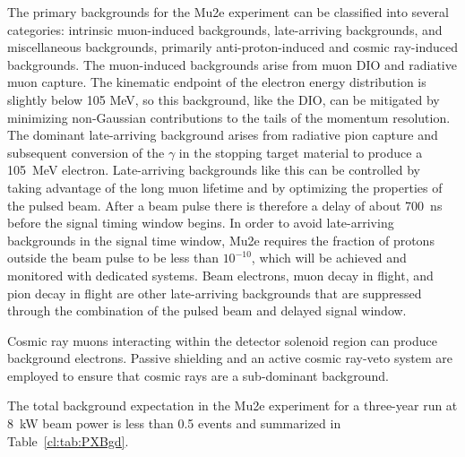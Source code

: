 The primary backgrounds for the Mu2e experiment can be classified into
several categories: intrinsic muon-induced backgrounds, late-arriving
backgrounds, and miscellaneous backgrounds, primarily anti-proton-induced 
and cosmic ray-induced backgrounds. The muon-induced
backgrounds arise from muon DIO and radiative muon capture.  The
kinematic endpoint of the electron energy distribution is slightly
below 105 MeV, so this background, like the DIO, can be mitigated by
minimizing non-Gaussian contributions to the tails of the momentum
resolution.  The dominant late-arriving background arises from
radiative pion capture and subsequent conversion of the $\gamma$ in
the stopping target material to produce a 105~MeV electron.
Late-arriving backgrounds like this can be controlled by taking
advantage of the long muon lifetime and by optimizing the properties
of the pulsed beam.  After a beam pulse there is therefore a delay of about
700~ns before the signal timing window begins.  In order to avoid
late-arriving backgrounds in the signal time window, Mu2e requires the
fraction of protons outside the beam pulse to be less than $10^{-10}$,
which will be achieved and monitored with dedicated systems.  Beam
electrons, muon decay in flight, and pion decay in flight are other
late-arriving backgrounds that are suppressed through the combination of
the pulsed beam and delayed signal window.


Cosmic ray muons interacting within the detector solenoid region can
produce background electrons.  Passive shielding and an active
cosmic ray-veto system are employed to ensure that cosmic rays are a
sub-dominant background.
 

The total background expectation in the Mu2e experiment for a
three-year run at 8~kW beam power is less than 0.5 events and
summarized in Table~\ref{cl:tab:PXBgd}.

